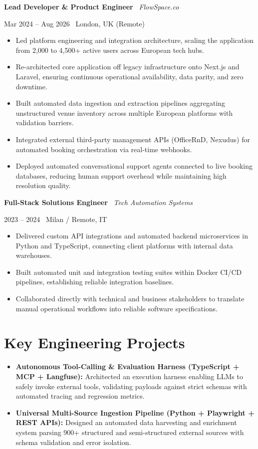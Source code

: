 \documentclass[a4paper,10pt]{article}
\newcommand{\role}[4]{%
  \vspace{2pt}\noindent
  \begin{minipage}[t]{0.70\textwidth}\raggedright\textbf{#1} \textbullet\ \textit{#3}\end{minipage}%
  \hfill
  \begin{minipage}[t]{0.28\textwidth}\raggedleft\footnotesize\color{gray}#2 \textbullet\ #4\end{minipage}%
  \vspace{1pt}%
}
\begin{document}
\vspace{3pt}
\role{Lead Developer \& Product Engineer}{Mar 2024 -- Aug 2026}{FlowSpace.co}{London, UK (Remote)}
\begin{itemize}
  \item Led platform engineering and integration architecture, scaling the application from 2,000 to 4,500+ active users across European tech hubs.
  \item Re-architected core application off legacy infrastructure onto Next.js and Laravel, ensuring continuous operational availability, data parity, and zero downtime.
  \item Built automated data ingestion and extraction pipelines aggregating unstructured venue inventory across multiple European platforms with validation barriers.
  \item Integrated external third-party management APIs (OfficeRnD, Nexudus) for automated booking orchestration via real-time webhooks.
  \item Deployed automated conversational support agents connected to live booking databases, reducing human support overhead while maintaining high resolution quality.
\end{itemize}

\vspace{3pt}
\role{Full-Stack Solutions Engineer}{2023 -- 2024}{Tech Automation Systems}{Milan / Remote, IT}
\begin{itemize}
  \item Delivered custom API integrations and automated backend microservices in Python and TypeScript, connecting client platforms with internal data warehouses.
  \item Built automated unit and integration testing suites within Docker CI/CD pipelines, establishing reliable integration baselines.
  \item Collaborated directly with technical and business stakeholders to translate manual operational workflows into reliable software specifications.
\end{itemize}

\section{Key Engineering Projects}
\begin{itemize}
  \item \textbf{Autonomous Tool-Calling \& Evaluation Harness (TypeScript + MCP + Langfuse):} Architected an execution harness enabling LLMs to safely invoke external tools, validating payloads against strict schemas with automated tracing and regression metrics.
  \item \textbf{Universal Multi-Source Ingestion Pipeline (Python + Playwright + REST APIs):} Designed an automated data harvesting and enrichment system parsing 900+ structured and semi-structured external sources with schema validation and error isolation.
\end{itemize}
\end{document}
